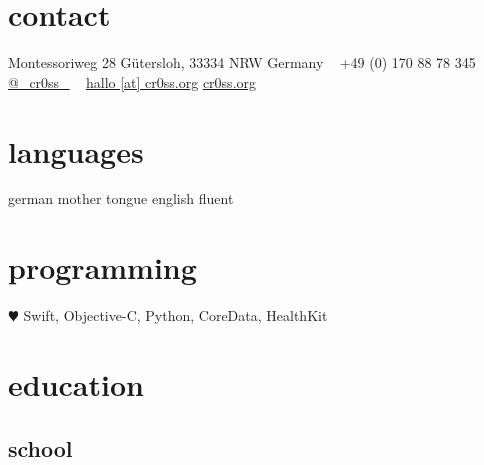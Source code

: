 \documentclass[]{friggeri-cv} %
\begin{document}


\begin{aside} %
\section{contact}
Montessoriweg 28
G\"{u}tersloh, 33334 NRW
Germany
~
+49 (0) 170 88 78 345
\href{https://twitter.com/_cr0ss_}{@\_cr0ss\_}
~
\href{mailto:hallo@cr0ss.org}{hallo [at] cr0ss.org}
\href{https://cr0ss.org}{cr0ss.org}
\section{languages}
german mother tongue
english fluent
\section{programming}
{\color{red} $\varheartsuit$} Swift,
Objective-C, Python,
CoreData, HealthKit
\end{aside}


\section{education}

\subsection{school}
\end{document}

